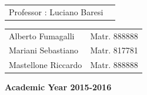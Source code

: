 \documentclass[15pt,a4paper,oneside]{article}
\begin{document}
\begin{center}
\begin{flushleft}
\begin{tabular}{l l }

\end{tabular}
\end{flushleft}
\vspace{5mm}

\begin{flushleft}
\begin{tabular}{l l }
Professor : Luciano Baresi\\
\end{tabular}
\end{flushleft}

\begin{flushright}
\begin{tabular}{l l }
Alberto Fumagalli & Matr. 888888\\
Mariani Sebastiano & Matr. 817781\\
Mastellone Riccardo & Matr. 888888\\
\end{tabular}
\end{flushright}

\vspace{43mm}
{\large{\bf Academic Year 2015-2016}}
\end{center}

\newpage
\tableofcontents
\listoffigures
\newpage





\newpage

\newpage

\newpage

\newpage

\newpage


%

%

%
\end{document}
